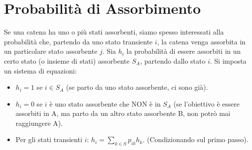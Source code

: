 \documentclass[12pt,a4paper]{article}
\begin{document}
\section{Probabilità di Assorbimento}
Se una catena ha uno o più stati assorbenti, siamo spesso interessati alla probabilità che, partendo da uno stato transiente $i$, la catena venga assorbita in un particolare stato assorbente $j$.
Sia $h_i$ la probabilità di essere assorbiti in un certo stato (o insieme di stati) assorbente $S_A$, partendo dallo stato $i$.
Si imposta un sistema di equazioni:
\begin{itemize}
    \item $h_i = 1$ se $i \in S_A$ (se parto da uno stato assorbente, ci sono già).
    \item $h_i = 0$ se $i$ è uno stato assorbente che NON è in $S_A$ (se l'obiettivo è essere assorbiti in A, ma parto da un altro stato assorbente B, non potrò mai raggiungere A).
    \item Per gli stati transienti $i$: $h_i = \sum_{k \in S} p_{ik} h_k$. (Condizionando sul primo passo).
\end{itemize}
\end{document}
